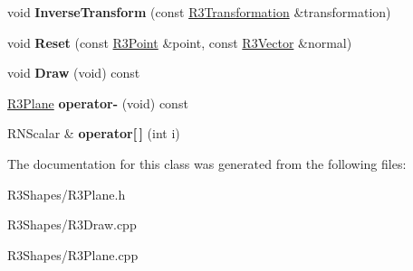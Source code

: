 \begin{DoxyCompactItemize}
\item 
void {\bfseries Inverse\+Transform} (const \hyperlink{class_r3_transformation}{R3\+Transformation} \&transformation)\hypertarget{class_r3_plane_a8c65f5ad20bb21c4534cbf48697351f3}{}\label{class_r3_plane_a8c65f5ad20bb21c4534cbf48697351f3}

\item 
void {\bfseries Reset} (const \hyperlink{class_r3_point}{R3\+Point} \&point, const \hyperlink{class_r3_vector}{R3\+Vector} \&normal)\hypertarget{class_r3_plane_a066d376445cfbe638454ab258278ac76}{}\label{class_r3_plane_a066d376445cfbe638454ab258278ac76}

\item 
void {\bfseries Draw} (void) const \hypertarget{class_r3_plane_a57f20f3f11fdbd7307f593460ada9ca1}{}\label{class_r3_plane_a57f20f3f11fdbd7307f593460ada9ca1}

\item 
\hyperlink{class_r3_plane}{R3\+Plane} {\bfseries operator-\/} (void) const \hypertarget{class_r3_plane_a7836d429701695de6a12f106e56ada13}{}\label{class_r3_plane_a7836d429701695de6a12f106e56ada13}

\item 
R\+N\+Scalar \& {\bfseries operator\mbox{[}$\,$\mbox{]}} (int i)\hypertarget{class_r3_plane_a2ccc61366f9be014e4cb01db35d633bd}{}\label{class_r3_plane_a2ccc61366f9be014e4cb01db35d633bd}

\end{DoxyCompactItemize}


The documentation for this class was generated from the following files\+:\begin{DoxyCompactItemize}
\item 
R3\+Shapes/R3\+Plane.\+h\item 
R3\+Shapes/R3\+Draw.\+cpp\item 
R3\+Shapes/R3\+Plane.\+cpp\end{DoxyCompactItemize}
